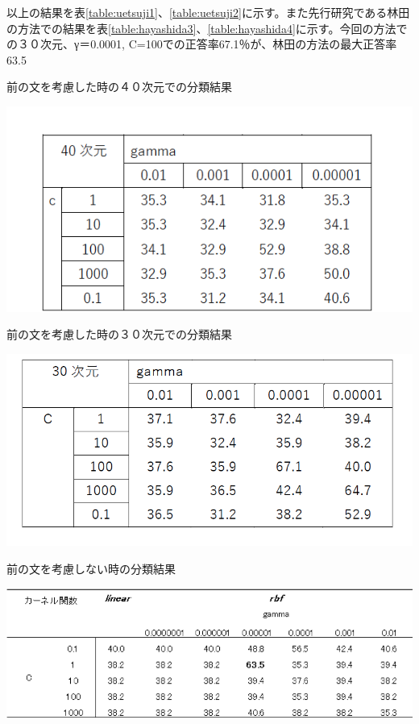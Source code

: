 \documentclass[shuuron]{kuee}
\begin{document}
以上の結果を表\ref{table:uetsuji1}、\ref{table:uetsuji2}に示す。また先行研究である林田の方法での結果を表\ref{table:hayashida3}、\ref{table:hayashida4}に示す。今回の方法での３０次元、γ＝0.0001, C=100での正答率67.1％が、林田の方法の最大正答率63.5%

\begin{table}
  \caption{前の文を考慮した時の４０次元での分類結果}
  \label{table:uetsuji1}
  \begin{center}
    \includegraphics[width=\linewidth]{uetsuji1.png}
  \end{center}
\end{table}

\begin{table}
  \caption{前の文を考慮した時の３０次元での分類結果}
  \label{table:uetsuji2}
  \begin{center}
    \includegraphics[width=\linewidth]{uetsuji2.png}
  \end{center}
\end{table}

\begin{table}
  \caption{前の文を考慮しない時の分類結果}
  \label{table:hayashida3}
  \begin{center}
    \includegraphics[width=\linewidth]{hayashida3.png}
  \end{center}
\end{table}
\end{document}
